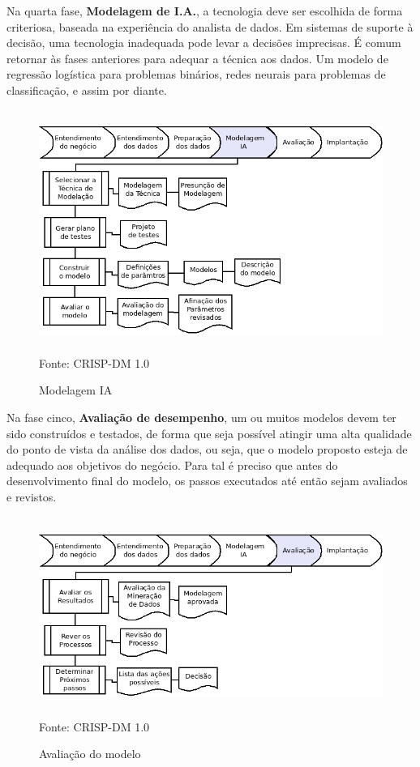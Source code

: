 \vspace{0.5cm}

Na quarta fase, \textbf{Modelagem de I.A.}, a tecnologia deve ser escolhida de forma criteriosa, baseada na experiência do analista de dados. 
Em sistemas de suporte à decisão, uma tecnologia inadequada pode levar a decisões imprecisas. É comum retornar às fases anteriores para adequar a técnica aos dados. 
Um modelo de regressão logística para problemas binários, redes neurais para problemas de classificação, e assim por diante.

\begin{figure}[!ht]
\centering
\caption{Modelagem IA}
\vspace{1mm}
\includegraphics[width=120mm, height=79mm]{Figuras/Cronograma/Model_IA.png}\\
\tiny Fonte: CRISP-DM 1.0
\end{figure}

\vspace{0.5cm}

Na fase cinco, \textbf{Avaliação de desempenho}, um ou muitos modelos devem ter sido construídos e testados, 
de forma que seja possível atingir uma alta qualidade do ponto de vista da análise dos dados, ou seja, que o 
modelo proposto esteja de adequado aos objetivos do negócio. Para tal é preciso que antes do desenvolvimento final 
do modelo, os passos executados até então sejam avaliados e revistos.

\begin{figure}[!ht]
\centering
\caption{Avaliação do modelo}
\vspace{1mm}
\includegraphics[width=120mm, height=65mm]{Figuras/Cronograma/Avaliacao.png}\\
\tiny Fonte: CRISP-DM 1.0
\end{figure}

